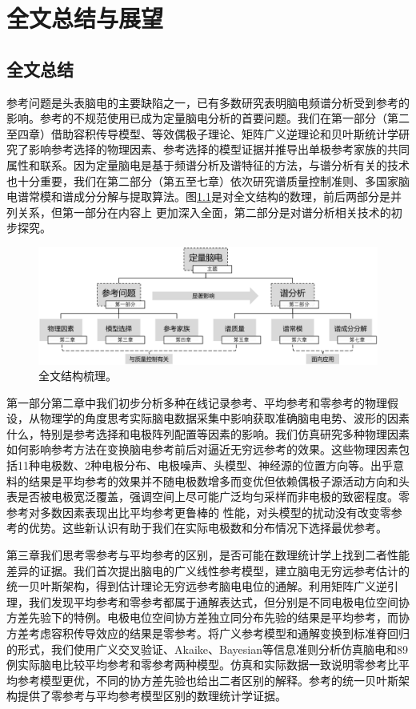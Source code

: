 \chapter{全文总结与展望}
\section{全文总结}
参考问题是头表脑电的主要缺陷之一，已有多数研究表明脑电频谱分析受到参考的影响。参考的不规范使用已成为定量脑电分析的首要问题。我们在第一部分（第二至四章）借助容积传导模型、等效偶极子理论、矩阵广义逆理论和贝叶斯统计学研究了影响参考选择的物理因素、参考选择的模型证据并推导出单极参考家族的共同属性和联系。因为定量脑电是基于频谱分析及谱特征的方法，与谱分析有关的技术也十分重要，我们在第二部分（第五至七章）依次研究谱质量控制准则、多国家脑电谱常模和谱成分分解与提取算法。图\ref{sum}是对全文结构的数理，前后两部分是并列关系，但第一部分在内容上
更加深入全面，第二部分是对谱分析相关技术的初步探究。
\begin{figure}[!h]
\includegraphics[width=\linewidth]{pic/sum/sum.png}
\caption{全文结构梳理。}
\label{sum}
\end{figure}

第一部分第二章中我们初步分析多种在线记录参考、平均参考和零参考的物理假设，从物理学的角度思考实际脑电数据采集中影响获取准确脑电电势、波形的因素什么，特别是参考选择和电极阵列配置等因素的影响。我们仿真研究多种物理因素如何影响参考方法在变换脑电参考前后对逼近无穷远参考的效果。这些物理因素包括11种电极数、2种电极分布、电极噪声、头模型、神经源的位置方向等。出乎意料的结果是平均参考的效果并不随电极数增多而变优但依赖偶极子源活动方向和头表是否被电极宽泛覆盖，强调空间上尽可能广泛均匀采样而非电极的致密程度。零参考对多数因素表现出比平均参考更鲁棒的
性能，对头模型的扰动没有改变零参考的优势。这些新认识有助于我们在实际电极数和分布情况下选择最优参考。

第三章我们思考零参考与平均参考的区别，是否可能在数理统计学上找到二者性能差异的证据。我们首次提出脑电的广义线性参考模型，建立脑电无穷远参考估计的统一贝叶斯架构，得到估计理论无穷远参考脑电电位的通解。利用矩阵广义逆引理，我们发现平均参考和零参考都属于通解表达式，但分别是不同电极电位空间协方差先验下的特例。电极电位空间协方差独立同分布先验的结果是平均参考，而协方差考虑容积传导效应的结果是零参考。将广义参考模型和通解变换到标准脊回归的形式，我们使用广义交叉验证、Akaike、Bayesian等信息准则分析仿真脑电和89例实际脑电比较平均参考和零参考两种模型。仿真和实际数据一致说明零参考比平均参考模型更优，不同的协方差先验也给出二者区别的解释。参考的统一贝叶斯架构提供了零参考与平均参考模型区别的数理统计学证据。

